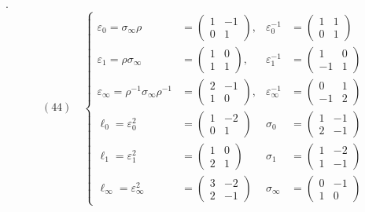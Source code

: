 .
\[
(44)\quad\left\{\begin{aligned}
\varepsilon_0=\sigma_\infty\rho&=\begin{pmatrix}1&-1\\0&1\end{pmatrix},&
\varepsilon_0^{-1}&=\begin{pmatrix}1&1\\0&1\end{pmatrix}\\
\varepsilon_1=\rho\sigma_\infty&=\begin{pmatrix}1&0\\1&1\end{pmatrix},&
\varepsilon_1^{-1}&=\begin{pmatrix}1&0\\-1&1\end{pmatrix}\\
\varepsilon_\infty=\rho^{-1}\sigma_\infty\rho^{-1}&=\begin{pmatrix}2&-1\\1&0\end{pmatrix},&
\varepsilon_\infty^{-1}&=\begin{pmatrix}0&1\\-1&2\end{pmatrix}\\
\ell_0=\varepsilon_0^2&=\begin{pmatrix}1&-2\\0&1\end{pmatrix}&
\sigma_0&=\begin{pmatrix}1&-1\\2&-1\end{pmatrix}\\
\ell_1=\varepsilon_1^2&=\begin{pmatrix}1&0\\2&1\end{pmatrix}&
\sigma_1&=\begin{pmatrix}1&-2\\1&-1\end{pmatrix}\\
\ell_\infty=\varepsilon_\infty^2&=\begin{pmatrix}3&-2\\2&-1\end{pmatrix}&
\sigma_\infty&=\begin{pmatrix}0&-1\\1&0\end{pmatrix}
\end{aligned}\right.
\]
